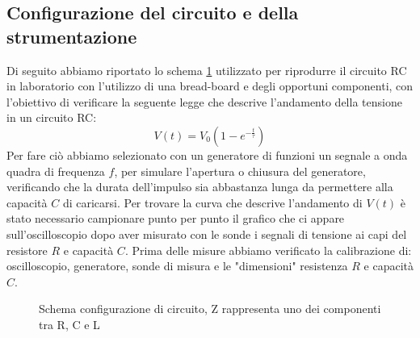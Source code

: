 \documentclass[letterpaper,12pt]{article}
\begin{document}
\subsection{Configurazione del circuito e della strumentazione}
Di seguito abbiamo riportato lo schema \ref{fig:config_circuito} utilizzato per riprodurre il circuito RC in laboratorio con l'utilizzo di una bread-board e degli opportuni componenti, con l'obiettivo di verificare la seguente legge che descrive l'andamento della tensione in un circuito RC:
\begin{equation}
	\label{eq: Modello esponenziale}
	V(t) = V_0 \left(1  -e^{-\frac{t}{\tau}}\right)
\end{equation}
Per fare ciò abbiamo selezionato con un generatore di funzioni un segnale a onda quadra di frequenza $f$, per simulare l'apertura o chiusura del generatore, verificando che la durata dell'impulso sia abbastanza lunga da permettere alla capacità $C$ di caricarsi.
Per trovare la curva che descrive l'andamento di $V(t)$ è stato necessario campionare punto per punto il grafico che ci appare sull'oscilloscopio dopo aver  misurato con le sonde i segnali di tensione ai capi del resistore $R$ e capacità $C$. Prima delle misure abbiamo verificato la calibrazione di: oscilloscopio, generatore, sonde di misura e le "dimensioni" resistenza $R$ e capacità $C$.
\begin{figure}[h!]
	\centering
	\caption{Schema configurazione di circuito, Z rappresenta uno dei componenti tra R, C e L}
	\label{fig:config_circuito}
\end{figure}
\end{document}
